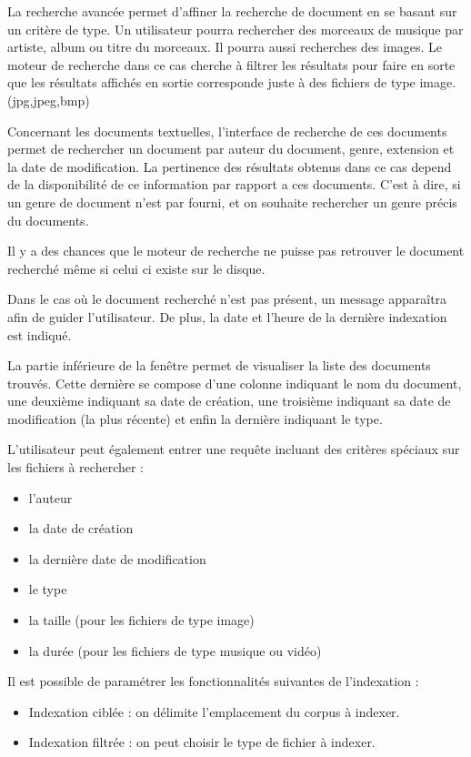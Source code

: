 La recherche avancée permet d'affiner la recherche de document en se basant sur un critère de type.
Un utilisateur pourra rechercher des morceaux de musique par artiste, album ou titre du morceaux.
Il pourra aussi recherches des images. Le moteur de recherche dans ce cas cherche à filtrer les résultats pour faire en sorte que
les résultats affichés en sortie corresponde juste à des fichiers de type image. (jpg,jpeg,bmp)

Concernant les documents textuelles, l'interface de recherche de ces documents permet de rechercher un document par auteur du document, genre, extension et la date de modification. La pertinence des résultats obtenus dans ce cas depend de la disponibilité de ce information par rapport a ces documents. C'est à dire, si un genre de document n'est par fourni, et on souhaite rechercher un genre précis du documents.

Il y a des chances que le moteur de recherche ne puisse pas retrouver le document recherché même si celui ci existe sur le disque.

Dans le cas où le document recherché n'est pas présent, un message apparaîtra afin de guider l'utilisateur. 
De plus, la date et l'heure de la dernière indexation est indiqué.

La partie inférieure de la fenêtre permet de visualiser la liste des documents trouvés. 
Cette dernière se compose d'une colonne indiquant le nom du document, une deuxième indiquant sa date de création, une troisième indiquant sa date de modification (la plus récente) et enfin la dernière indiquant le type.



L'utilisateur peut également entrer une requête incluant des critères spéciaux
sur les fichiers à rechercher :
\begin{itemize}
 \item l'auteur
 \item la date de création
 \item la dernière date de modification
 \item le type
 \item la taille (pour les fichiers de type image)
 \item la durée (pour les fichiers de type musique ou vidéo)
\end{itemize}

Il est possible de paramétrer les fonctionnalités suivantes de l'indexation :
\begin{itemize}
 \item Indexation ciblée : on délimite l'emplacement du corpus à indexer.
 \item Indexation filtrée : on peut choisir le type de fichier à indexer.
\end{itemize}


